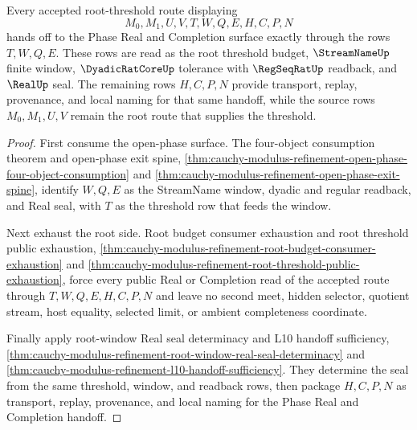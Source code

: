 \begin{theorem}
\label{thm:cauchy-modulus-refinement-root-threshold-open-phase-handoff}
Every accepted root-threshold route displaying
$$
M_0,M_1,U,V,T,W,Q,E,H,C,P,N
$$
hands off to the Phase Real and Completion surface exactly through the rows $T,W,Q,E$. These rows are read as the root threshold budget, $\StreamNameUp$ finite window, $\DyadicRatCoreUp$ tolerance with $\RegSeqRatUp$ readback, and $\RealUp$ seal. The remaining rows $H,C,P,N$ provide transport, replay, provenance, and local naming for that same handoff, while the source rows $M_0,M_1,U,V$ remain the root route that supplies the threshold.
\end{theorem}
\begin{proof}
First consume the open-phase surface. The four-object consumption theorem and open-phase exit spine, \autoref{thm:cauchy-modulus-refinement-open-phase-four-object-consumption} and \autoref{thm:cauchy-modulus-refinement-open-phase-exit-spine}, identify $W,Q,E$ as the StreamName window, dyadic and regular readback, and Real seal, with $T$ as the threshold row that feeds the window.

Next exhaust the root side. Root budget consumer exhaustion and root threshold public exhaustion, \autoref{thm:cauchy-modulus-refinement-root-budget-consumer-exhaustion} and \autoref{thm:cauchy-modulus-refinement-root-threshold-public-exhaustion}, force every public Real or Completion read of the accepted route through $T,W,Q,E,H,C,P,N$ and leave no second meet, hidden selector, quotient stream, host equality, selected limit, or ambient completeness coordinate.

Finally apply root-window Real seal determinacy and L10 handoff sufficiency, \autoref{thm:cauchy-modulus-refinement-root-window-real-seal-determinacy} and \autoref{thm:cauchy-modulus-refinement-l10-handoff-sufficiency}. They determine the seal from the same threshold, window, and readback rows, then package $H,C,P,N$ as transport, replay, provenance, and local naming for the Phase Real and Completion handoff.
\end{proof}

